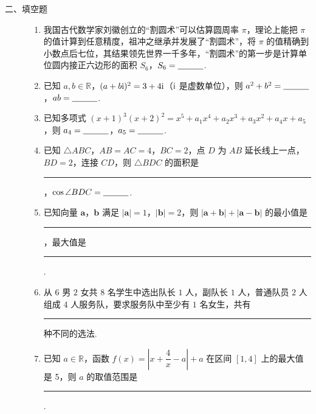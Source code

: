 \begin{description}

    \item[二、填空题]

    \begin{enumerate}[leftmargin=5pt]

      \addtocounter{enumi}{+10}

        \item 我国古代数学家刘徽创立的“割圆术”可以估算圆周率 \(\pi\)，理论上能把 \(\pi\) 的值计算到任意精度，祖冲之继承并发展了“割圆术”，将 \(\pi\) 的值精确到小数点后七位，其结果领先世界一千多年，“割圆术”的第一步是计算单位圆内接正六边形的面积 \(S_6\)，\(S_6=\rule[-0.3ex]{3em}{0.4pt}\).

        \item 已知 \(a,b\in\mathbb{R}\)，\((a+b\mathrm{i})^2=3+4\mathrm{i}\)（\(\mathrm{i}\) 是虚数单位），则 \(a^2+b^2=\rule[-0.3ex]{3em}{0.4pt}\)，\(ab=\rule[-0.3ex]{3em}{0.4pt}\).

        \item 已知多项式 \((x+1)^3(x+2)^2=x^5+a_1x^4+a_2x^3+a_3x^2+a_4x+a_5\)，则 \(a_4=\rule[-0.3ex]{3em}{0.4pt}\)，\(a_5=\rule[-0.3ex]{3em}{0.4pt}\).

        \item 已知 \(\triangle ABC\)，\(AB=AC=4\)，\(BC=2\)，点 \(D\) 为 \(AB\) 延长线上一点，\(BD=2\)，连接 \(CD\)，则 \(\triangle BDC\) 的面积是\rule[-0.3ex]{3em}{0.4pt}，\(\cos\angle BDC=\rule[-0.3ex]{3em}{0.4pt}\).

        \item 已知向量 \(\bm{a}\)，\(\bm{b}\) 满足 \(|\bm{a}|=1\)，\(|\bm{b}|=2\)，则 \(|\bm{a}+\bm{b}|+|\bm{a}-\bm{b}|\) 的最小值是\rule[-0.3ex]{3em}{0.4pt}，最大值是\rule[-0.3ex]{3em}{0.4pt}.

        \item 从 \(6\) 男 \(2\) 女共 \(8\) 名学生中选出队长 \(1\) 人，副队长 \(1\) 人，普通队员 \(2\) 人组成 \(4\) 人服务队，要求服务队中至少有 \(1\) 名女生，共有\rule[-0.3ex]{3em}{0.4pt} 种不同的选法.

        \item 已知 \(a\in\mathbb{R}\)，函数 \(f(x)=\left|x+\dfrac{4}{x}-a\right|+a\) 在区间 \([1,4]\) 上的最大值是 5，则 \(a\) 的取值范围是\rule[-0.3ex]{3em}{0.4pt}.

    \end{enumerate}

\end{description}

